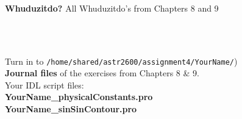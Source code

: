 \documentclass{article}
\begin{document}
\begin{spacing}{1.0}
  \par \\ 
  \par \\ 
  \par \\ 
  \textbf{Whuduzitdo?}   All Whuduzitdo’s from Chapters 8 and 9 %
  \par \\ 
  \par \\ 
  Turn in to \verb|/home/shared/astr2600/assignment4/YourName/|) \\ 
  \textbf{Journal files}  of the exercises from Chapters 8 \& 9. \\ 
  Your IDL script files:   \\ 
  \textbf{YourName\_physicalConstants.pro} \\ 
  \textbf{YourName\_sinSinContour.pro} \\ 
  \par \\ 

\end{spacing}
\end{document}
